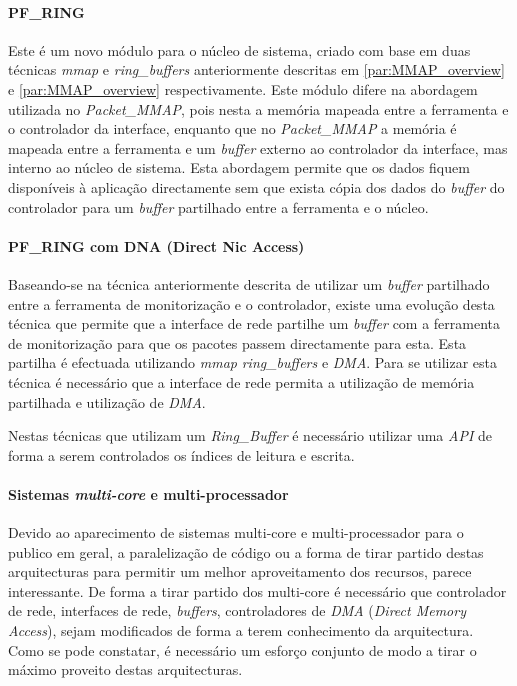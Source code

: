 \paragraph*{PF\_RING}

Este é um novo módulo para o núcleo de sistema, criado com base em duas técnicas \textit{mmap} e \textit{ring\_buffers} anteriormente descritas em \ref{par:MMAP_overview} e \ref{par:MMAP_overview} respectivamente.
Este módulo difere na abordagem utilizada no \textit{Packet\_MMAP}, pois nesta a memória mapeada entre a ferramenta e o controlador da interface, enquanto que no \textit{Packet\_MMAP} a memória é mapeada entre a ferramenta e um \textit{buffer} externo ao controlador da interface, mas interno ao núcleo de sistema.
Esta abordagem permite que os dados fiquem disponíveis à aplicação directamente sem que exista cópia dos dados do \textit{buffer} do controlador para um \textit{buffer} partilhado entre a ferramenta e o núcleo\cite{:PF_RING}.
 
\paragraph*{PF\_RING com DNA (Direct Nic Access)}
Baseando-se na técnica anteriormente descrita de utilizar um \textit{buffer} partilhado entre a ferramenta de monitorização e o controlador, existe uma evolução desta técnica que permite que a interface de rede partilhe um \textit{buffer} com a ferramenta de monitorização para que os pacotes passem directamente para esta.
Esta partilha é efectuada utilizando \textit{mmap} \textit{ring\_buffers} e \textit{DMA}.
Para se utilizar esta técnica é necessário que a interface de rede permita a utilização de memória partilhada e utilização de \textit{DMA}.

Nestas técnicas que utilizam um \textit{Ring\_Buffer} é necessário utilizar uma \textit{API} de forma a serem controlados os índices de leitura e escrita\cite{:IntroPF_RIDNADirecNICAcces}.

\paragraph*{Sistemas \textit{multi-core} e multi-processador}
Devido ao aparecimento de sistemas multi-core e multi-processador para o publico em geral, a paralelização de código ou a forma de tirar partido destas arquitecturas para permitir um melhor aproveitamento dos recursos, parece interessante. 
De forma a tirar partido dos multi-core é necessário que controlador de rede, interfaces de rede, \textit{buffers}, controladores de \textit{DMA} (\textit{Direct Memory Access}), sejam modificados de forma a terem conhecimento da arquitectura. Como se pode constatar, é necessário um esforço conjunto de modo a tirar o máximo proveito destas arquitecturas\cite{Deri:2010}.


